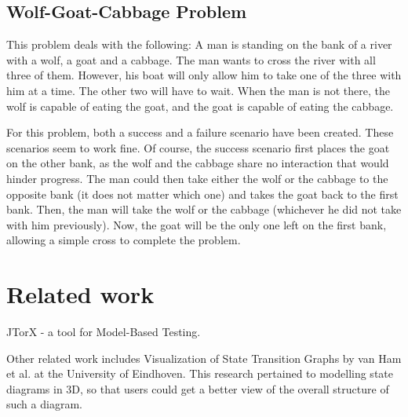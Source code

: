 \documentclass[12pt,a4paper]{article}
\begin{document}
\subsection{Wolf-Goat-Cabbage Problem}
This problem deals with the following: A man is standing on the bank of a river with a wolf, a goat and a cabbage. The man wants to cross the river with all three of them. However, his boat will only allow him to take one of the three with him at a time. The other two will have to wait. When the man is not there, the wolf is capable of eating the goat, and the goat is capable of eating the cabbage.

For this problem, both a success and a failure scenario have been created. These scenarios seem to work fine.
Of course, the success scenario first places the goat on the other bank, as the wolf and the cabbage share no interaction that would hinder progress. The man could then take either the wolf or the cabbage to the opposite bank (it does not matter which one) and takes the goat back to the first bank. Then, the man will take the wolf or the cabbage (whichever he did not take with him previously). Now, the goat will be the only one left on the first bank, allowing a simple cross to complete the problem.

\clearpage
\section{Related work}
JTorX - a tool for Model-Based Testing.

Other related work includes Visualization of State Transition Graphs by van Ham et al. at the University of Eindhoven. This research pertained to modelling state diagrams in 3D, so that users could get a better view of the overall structure of such a diagram.
\end{document}
